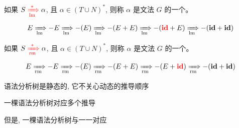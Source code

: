 \begin{frame}{}
  \begin{definition}
    如果 $S \;\red{\dstarlm}\; \alpha$, 且 $\alpha \in (T \cup N)^{\ast}$,
    则称 $\alpha$ 是文法 $G$ 的一个。 
  \end{definition}

  \[
    E \lm -E \lm -(E) \lm -(E + E) \lm -(\red{\id} + E) \lm -(\id + \id)
  \]

  \begin{definition}
    如果 $S \;\red{\dstarrm}\; \alpha$, 且 $\alpha \in (T \cup N)^{\ast}$,
    则称 $\alpha$ 是文法 $G$ 的一个。 
  \end{definition}

  \[
    E \rm -E \rm -(E) \rm -(E + E) \rm -(E + \red{\id}) \rm -(\id + \id)
  \]
\end{frame}

\begin{frame}{}
  \begin{center}

    \vspace{0.30cm}
    语法分析树是静态的, 它不关心动态的推导顺序


    一棵语法分析树对应多个推导

    \pause
    \vspace{0.30cm}
    但是, 一棵语法分析树与一一对应
  \end{center}
\end{frame}
